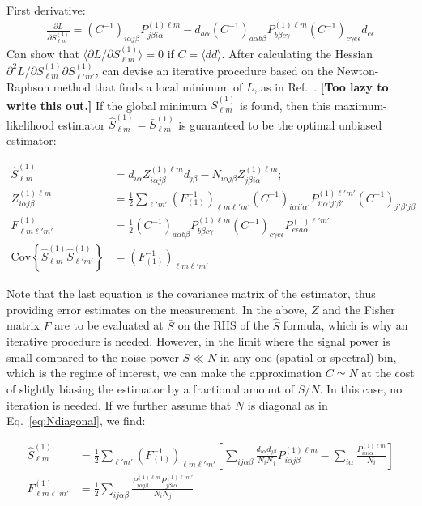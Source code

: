 \documentclass[twocolumn]{aastex63}
\newcommand{\Cinv}{(C^{-1})}
\newcommand{\blue}[1]{\textcolor{deepblue}{\bf #1}}
\begin{document}
First derivative:
\begin{align}
\frac{\partial L}{\partial S^{(1)}_{\ell m}} = \Cinv_{i \alpha j \beta} P^{(1) \ell m}_{j \beta i \alpha} - d_{a \alpha} \Cinv_{a \alpha b \beta} P^{(1) \ell m}_{b \beta c \gamma} \Cinv_{c \gamma e \epsilon} d_{e \epsilon}
\end{align}
Can show that $\langle {\partial L}/{\partial S^{(1)}_{\ell m}} \rangle = 0$ if $C = \langle d d \rangle$. After calculating the Hessian $ {\partial^2 L}/{\partial S^{(1)}_{\ell m} \partial S^{(1)}_{\ell' m'}}$, can devise an iterative procedure based on the Newton-Raphson method that finds a local minimum of $L$, as in Ref.~\cite{dahlen2008spectral}. \blue{[Too lazy to write this out.]} If the global minimum $\bar{S}^{(1)}_{\ell m}$ is found, then this maximum-likelihood estimator $\hat{S}^{(1)}_{\ell m} = \bar{S}^{(1)}_{\ell m}$ is guaranteed to be the optimal unbiased estimator:
\begin{widetext}
\begin{align}
\hat{S}^{(1)}_{\ell m} &= d_{i\alpha} Z^{(1) \ell m}_{i\alpha j \beta} d_{j \beta} - N_{i \alpha j \beta} Z^{(1) \ell m}_{j \beta i\alpha}; \\
Z^{(1) \ell m}_{i \alpha j \beta} &= \frac{1}{2} \sum_{\ell' m'} (F_{(1)}^{-1})_{\ell m \ell' m'} \Cinv_{i \alpha i' \alpha'} P^{(1) \ell' m'}_{i' \alpha' j' \beta'} \Cinv_{j' \beta' j \beta} \\
F^{(1)}_{\ell m \ell' m'} &= \frac{1}{2} \Cinv_{a \alpha b \beta} P^{(1) \ell m}_{b \beta c \gamma} \Cinv_{c \gamma e \epsilon} P^{(1) \ell' m'}_{e \epsilon a \alpha} \\
\text{Cov}\left\lbrace \hat{S}^{(1)}_{\ell m} \hat{S}^{(1)}_{\ell' m'} \right\rbrace &= (F_{(1)}^{-1})_{\ell m \ell' m'}
\end{align}
\end{widetext}

Note that the last equation is the covariance matrix of the estimator, thus providing error estimates on the measurement.
In the above, $Z$ and the Fisher matrix $F$ are to be evaluated at $\bar{S}$ on the RHS of the $\hat{S}$ formula, which is why an iterative procedure is needed. However, in the limit where the signal power is small compared to the noise power $S \ll N$ in any one (spatial or spectral) bin, which is the regime of interest, we can make the approximation $C \simeq N$ at the cost of slightly biasing the estimator by a fractional amount of $S/N$. In this case, no iteration is needed. If we further assume that $N$ is diagonal as in Eq.~\ref{eq:Ndiagonal}, we find:
\begin{widetext}
\begin{align}
\hat{S}^{(1)}_{\ell m} &= \frac{1}{2} \sum_{\ell' m'} (F_{(1)}^{-1})_{\ell m \ell' m'} \left[\sum_{i j \alpha \beta}  \frac{ d_{i \alpha} d_{j \beta}}{N_i N_j} P^{(1)\ell m}_{i \alpha j \beta} - \sum_{i \alpha}  \frac{P^{(1)\ell m}_{i \alpha i \alpha}}{N_i} \right] \\
F^{(1)}_{\ell m \ell' m'} &= \frac{1}{2} \sum_{i j \alpha \beta} \frac{P^{(1)\ell m}_{i \alpha j \beta} P^{(1)\ell' m'}_{j \beta i \alpha}}{N_i N_j}
\end{align}
\end{widetext}
\end{document}
